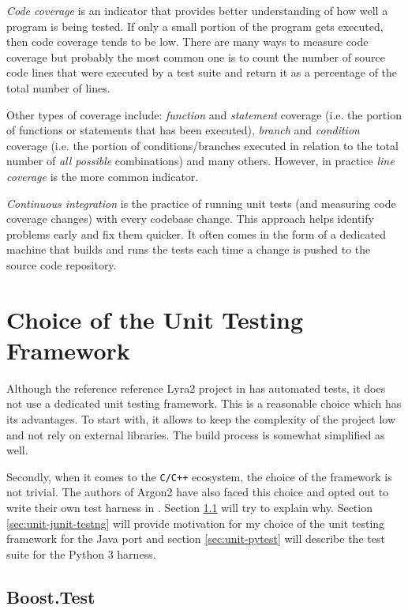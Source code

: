 \emph{Code coverage} is an indicator that provides better understanding of how well a program is being tested. If only a small portion of the program gets executed, then code coverage tends to be low. There are many ways to measure code coverage but probably the most common one is to count the number of source code lines that were executed by a test suite and return it as a percentage of the total number of lines.

Other types of coverage include: \emph{function} and \emph{statement} coverage (i.e. the portion of functions or statements that has been executed), \emph{branch} and \emph{condition} coverage (i.e. the portion of conditions/branches executed in relation to the total number of \emph{all possible} combinations) and many others. However, in practice \emph{line coverage} is the more common indicator.

\emph{Continuous integration} is the practice of running unit tests (and measuring code coverage changes) with every codebase change. This approach helps identify problems early and fix them quicker. It often comes in the form of a dedicated machine that builds and runs the tests each time a change is pushed to the source code repository.

\section{Choice of the Unit Testing Framework}

Although the reference reference Lyra2 project in \cite{github:2017:lyra} has automated tests, it does not use a dedicated unit testing framework. This is a reasonable choice which has its advantages. To start with, it allows to keep the complexity of the project low and not rely on external libraries. The build process is somewhat simplified as well.

Secondly, when it comes to the \texttt{C/C++} ecosystem, the choice of the framework is not trivial. The authors of Argon2 have also faced this choice and opted out to write their own test harness in \cite{github:2017:argon2-test.c}. Section \ref{sec:unit-boost-google} will try to explain why. Section \ref{sec:unit-junit-testng} will provide motivation for my choice of the unit testing framework for the Java port and section \ref{sec:unit-pytest} will describe the test suite for the Python 3 harness.

\subsection{Boost.Test}
\label{sec:unit-boost-google}

